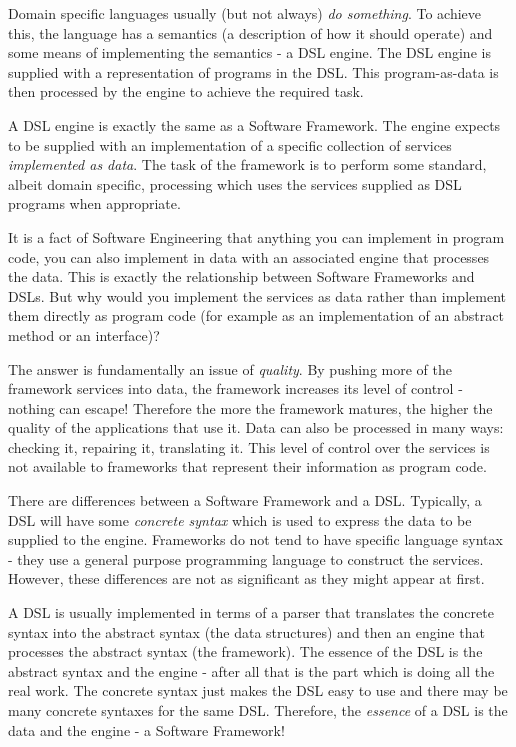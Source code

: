Domain specific languages usually (but not always) {\em do something}. To 
achieve this, the language has a semantics (a description of how it 
should operate) and some means of implementing the semantics - a DSL 
engine. The DSL engine is supplied with a representation of programs in 
the DSL. This program-as-data is then processed by the engine to achieve 
the required task.

A DSL engine is exactly the same as a Software Framework. The engine 
expects to be supplied with an implementation of a specific collection of 
services {\em implemented as data}. The task of the framework is to perform some 
standard, albeit domain specific, processing which uses the services 
supplied as DSL programs when appropriate.

It is a fact of Software Engineering that anything you can implement 
in program code, you can also implement in data with an associated 
engine that processes the data. This is exactly the relationship between 
Software Frameworks and DSLs. But why would you implement the services 
as data rather than implement them directly as program code (for example 
as an implementation of an abstract method or an interface)?

The answer is fundamentally an issue of {\em quality}. By pushing more of the 
framework services into data, the framework increases its level of control  
- nothing can escape! Therefore the more the framework matures, the higher 
the quality of the applications that use it. Data can also be processed in 
many ways: checking it, repairing it, translating it. This level of control 
over the services is not available to frameworks that represent their information 
as program code.

There are differences between a Software Framework and a DSL. Typically, a 
DSL will have some {\em concrete syntax} which is used to express the data to be 
supplied to the engine. Frameworks do not tend to have specific language 
syntax - they use a general purpose programming language to construct the 
services. However, these differences are not as significant as they might 
appear at first.

A DSL is usually implemented in terms of a parser that translates the 
concrete syntax into the abstract syntax (the data structures) and then 
an engine that processes the abstract syntax (the framework). The essence 
of the DSL is the abstract syntax and the engine - after all that is the 
part which is doing all the real work. The concrete syntax just makes the 
DSL easy to use and there may be many concrete syntaxes for the same DSL. 
Therefore, the {\em essence} of a DSL is the data and the engine - a Software 
Framework!

